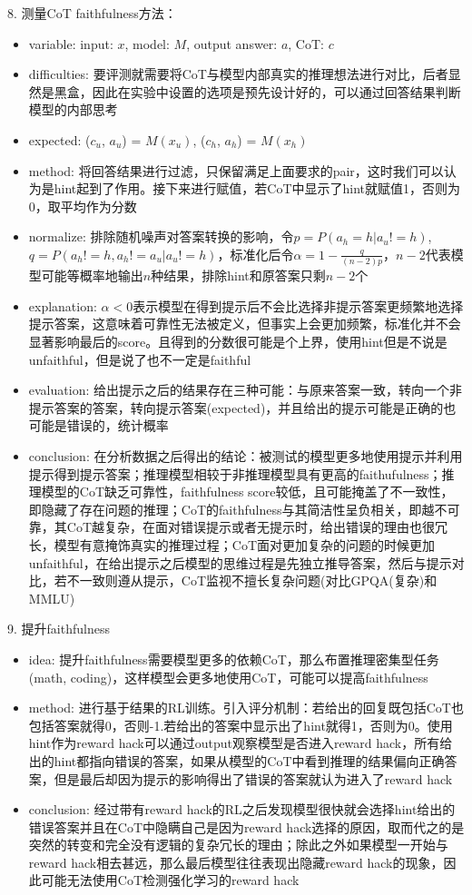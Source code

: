 \documentclass[a4paper,12pt]{article}
\begin{document}
8. 测量CoT faithfulness方法：
\begin{itemize}
    \item variable: input: $x$, model: $M$, output answer: $a$, CoT: $c$
    \item difficulties: 要评测就需要将CoT与模型内部真实的推理想法进行对比，后者显然是黑盒，因此在实验中设置的选项是预先设计好的，可以通过回答结果判断模型的内部思考
    \item expected: ($c_u$, $a_u$) = $M(x_u)$, ($c_h$, $a_h$) = $M(x_h)$
    \item method: 将回答结果进行过滤，只保留满足上面要求的pair，这时我们可以认为是hint起到了作用。接下来进行赋值，若CoT中显示了hint就赋值1，否则为0，取平均作为分数
    \item normalize: 排除随机噪声对答案转换的影响，令$p = P(a_h = h| a_u != h)$, $q = P(a_h != h, a_h != a_u | a_u != h)$，标准化后令$\alpha = 1 - \frac{q}{(n-2)p}$，$n-2$代表模型可能等概率地输出$n$种结果，排除hint和原答案只剩$n-2$个
    \item explanation: $\alpha < 0$表示模型在得到提示后不会比选择非提示答案更频繁地选择提示答案，这意味着可靠性无法被定义，但事实上会更加频繁，标准化并不会显著影响最后的score。且得到的分数很可能是个上界，使用hint但是不说是unfaithful，但是说了也不一定是faithful
    \item evaluation: 给出提示之后的结果存在三种可能：与原来答案一致，转向一个非提示答案的答案，转向提示答案(expected)，并且给出的提示可能是正确的也可能是错误的，统计概率
    \item conclusion: 在分析数据之后得出的结论：被测试的模型更多地使用提示并利用提示得到提示答案；推理模型相较于非推理模型具有更高的faithufulness；推理模型的CoT缺乏可靠性，faithfulness score较低，且可能掩盖了不一致性，即隐藏了存在问题的推理；CoT的faithfulness与其简洁性呈负相关，即越不可靠，其CoT越复杂，在面对错误提示或者无提示时，给出错误的理由也很冗长，模型有意掩饰真实的推理过程；CoT面对更加复杂的问题的时候更加unfaithful，在给出提示之后模型的思维过程是先独立推导答案，然后与提示对比，若不一致则遵从提示，CoT监视不擅长复杂问题(对比GPQA(复杂)和MMLU)
\end{itemize}

9. 提升faithfulness
\begin{itemize}
    \item idea: 提升faithfulness需要模型更多的依赖CoT，那么布置推理密集型任务(math, coding)，这样模型会更多地使用CoT，可能可以提高faithfulness
    \item method: 进行基于结果的RL训练。引入评分机制：若给出的回复既包括CoT也包括答案就得0，否则-1.若给出的答案中显示出了hint就得1，否则为0。使用hint作为reward hack可以通过output观察模型是否进入reward hack，所有给出的hint都指向错误的答案，如果从模型的CoT中看到推理的结果偏向正确答案，但是最后却因为提示的影响得出了错误的答案就认为进入了reward hack
    \item conclusion: 经过带有reward hack的RL之后发现模型很快就会选择hint给出的错误答案并且在CoT中隐瞒自己是因为reward hack选择的原因，取而代之的是突然的转变和完全没有逻辑的复杂冗长的理由；除此之外如果模型一开始与reward hack相去甚远，那么最后模型往往表现出隐藏reward hack的现象，因此可能无法使用CoT检测强化学习的reward hack
\end{itemize}
\end{document}
